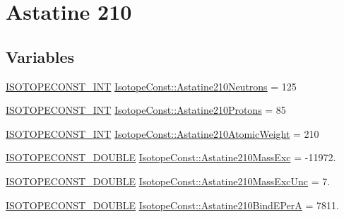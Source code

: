 \hypertarget{group___isotope_const-_astatine-_at210}{}\section{Astatine 210}
\label{group___isotope_const-_astatine-_at210}
\subsection*{Variables}
\begin{DoxyCompactItemize}
\item 
\mbox{\hyperlink{group___isotope_const-_macros_ga5f18360b3e99483a35c32d789e62621c}{I\+S\+O\+T\+O\+P\+E\+C\+O\+N\+S\+T\+\_\+\+I\+NT}} \mbox{\hyperlink{group___isotope_const-_astatine-_at210_ga199fbae4b0b9eae5a8fe66e4e1939beb}{Isotope\+Const\+::\+Astatine210\+Neutrons}} = 125
\item 
\mbox{\hyperlink{group___isotope_const-_macros_ga5f18360b3e99483a35c32d789e62621c}{I\+S\+O\+T\+O\+P\+E\+C\+O\+N\+S\+T\+\_\+\+I\+NT}} \mbox{\hyperlink{group___isotope_const-_astatine-_at210_gae4272fad98714e82851ae18be192ea65}{Isotope\+Const\+::\+Astatine210\+Protons}} = 85
\item 
\mbox{\hyperlink{group___isotope_const-_macros_ga5f18360b3e99483a35c32d789e62621c}{I\+S\+O\+T\+O\+P\+E\+C\+O\+N\+S\+T\+\_\+\+I\+NT}} \mbox{\hyperlink{group___isotope_const-_astatine-_at210_ga1627433dded665b584d9c021a93bd86a}{Isotope\+Const\+::\+Astatine210\+Atomic\+Weight}} = 210
\item 
\mbox{\hyperlink{group___isotope_const-_macros_ga8f45a7272ce02c0b4c65c44636ed719a}{I\+S\+O\+T\+O\+P\+E\+C\+O\+N\+S\+T\+\_\+\+D\+O\+U\+B\+LE}} \mbox{\hyperlink{group___isotope_const-_astatine-_at210_ga8fba0420bb2e3b52dcc9d4155acdd638}{Isotope\+Const\+::\+Astatine210\+Mass\+Exc}} = -\/11972.
\item 
\mbox{\hyperlink{group___isotope_const-_macros_ga8f45a7272ce02c0b4c65c44636ed719a}{I\+S\+O\+T\+O\+P\+E\+C\+O\+N\+S\+T\+\_\+\+D\+O\+U\+B\+LE}} \mbox{\hyperlink{group___isotope_const-_astatine-_at210_gaea16e25fa0a943b8cd760bc15913f602}{Isotope\+Const\+::\+Astatine210\+Mass\+Exc\+Unc}} = 7.
\item 
\mbox{\hyperlink{group___isotope_const-_macros_ga8f45a7272ce02c0b4c65c44636ed719a}{I\+S\+O\+T\+O\+P\+E\+C\+O\+N\+S\+T\+\_\+\+D\+O\+U\+B\+LE}} \mbox{\hyperlink{group___isotope_const-_astatine-_at210_ga782a37d96b2f2b2ca971cc1b1bdbc0a2}{Isotope\+Const\+::\+Astatine210\+Bind\+E\+PerA}} = 7811.
\item 

\end{DoxyCompactItemize}
